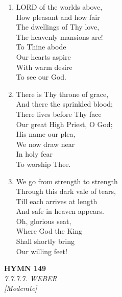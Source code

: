 \begin{enumerate}
    \item LORD of the worlds above, \\
        How pleasant and how fair \\
        The dwellings of Thy love, \\
        The heavenly mansions are! \\
        To Thine abode \\
        Our hearts aspire \\
        With warm desire \\
        To see our God.

    \item There is Thy throne of grace, \\
        And there the sprinkled blood; \\
        There lives before Thy face \\
        Our great High Priest, O God; \\
        His name our plea, \\
        We now draw near \\
        In holy fear \\
        To worship Thee.

    \item We go from strength to strength \\
        Through this dark vale of tears, \\
        Till each arrives at length \\
        And safe in heaven appears. \\
        Oh, glorious seat, \\
        Where God the King \\
        Shall shortly bring \\
        Our willing feet!

\end{enumerate}

\newpage
\begin{center}
    {\Large \textbf{HYMN 149}}
    \\
    \textit{7.7.7.7. WEBER}
    \\
    \textit{\small [Moderate]}
\end{center}
\vspace{1em}

